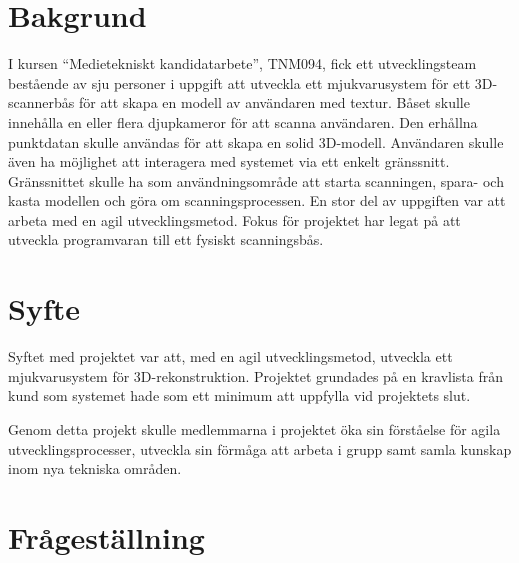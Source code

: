 \documentclass[a4paper,12pt,oneside,final]{extbook}
\begin{document}
\section{Bakgrund}
I kursen “Medietekniskt kandidatarbete”, TNM094, fick ett utvecklingsteam bestående av sju personer i uppgift att utveckla ett mjukvarusystem för ett 3D-scannerbås för att skapa en modell av användaren med textur. Båset skulle innehålla en eller flera djupkameror för att scanna användaren. Den erhållna punktdatan skulle användas för att skapa en solid 3D-modell. Användaren skulle även ha möjlighet att interagera med systemet via ett enkelt gränssnitt. Gränssnittet skulle ha som användningsområde att starta scanningen, spara- och kasta modellen och göra om scanningsprocessen. En stor del av uppgiften var att arbeta med en agil utvecklingsmetod. Fokus för projektet har legat på att utveckla programvaran till ett fysiskt scanningsbås.

\section{Syfte}
Syftet med projektet var att, med en agil utvecklingsmetod, utveckla ett mjukvarusystem för 3D-rekonstruktion. Projektet grundades på en kravlista från kund som systemet hade som ett minimum att uppfylla vid projektets slut.

Genom detta projekt skulle medlemmarna i projektet öka sin förståelse för agila utvecklingsprocesser, utveckla sin förmåga att arbeta i grupp samt samla kunskap inom nya tekniska områden.





\section{Frågeställning}
\end{document}

